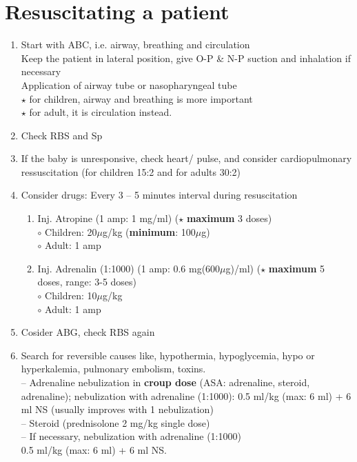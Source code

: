 \documentclass[11pt,a4paper]{report}
\begin{document}
\section{Resuscitating a patient}
\begin{enumerate}
	\item Start with ABC, i.e. airway, breathing and circulation \\
	Keep the patient in lateral position, give O-P \& N-P suction and  inhalation if necessary \\
	Application of airway tube or nasopharyngeal tube \\
	{\color{red}$\star$} for children, airway and breathing is more important \\
	{\color{red}$\star$} for adult, it is circulation instead.
	
	\item Check RBS and Sp
	\item If the baby is unresponsive, check heart/ pulse, and consider cardiopulmonary ressuscitation (for children 15:2 and for adults 30:2)
	\item Consider drugs: Every 3 -- 5 minutes interval during resuscitation 
	\begin{enumerate}
		\item Inj. Atropine (1 amp: 1 mg/ml)
		($\star$ \textbf{maximum} 3 doses) \\
		{\color{red}$\circ$} Children: 20$\mu$g/kg (\textbf{minimum}: 100$\mu$g) \\
		{\color{red}$\circ$} Adult: 1 amp
		\item Inj. Adrenalin (1:1000) (1 amp: 0.6 mg(600$\mu$g)/ml) 
		($\star$ \textbf{maximum} 5 doses, range: 3-5 doses)\\
		{\color{red}$\circ$} Children: 10$\mu$g/kg \\
		{\color{red}$\circ$} Adult: 1 amp 
	\end{enumerate}
	
	\item Cosider ABG, check RBS again 
	\item Search for reversible causes like, hypothermia, hypoglycemia, hypo or hyperkalemia, pulmonary embolism, toxins. \\
	-- Adrenaline nebulization in \textbf{croup dose} (ASA: adrenaline, steroid, adrenaline); nebulization with adrenaline (1:1000): 0.5 ml/kg (max: 6 ml) + 6 ml NS (usually improves with 1 nebulization) \\
	-- Steroid (prednisolone 2 mg/kg single dose) \\
	-- If necessary,  nebulization with adrenaline (1:1000) \\ 0.5 ml/kg (max: 6 ml) + 6 ml NS. 
	
\end{enumerate}
\end{document}
